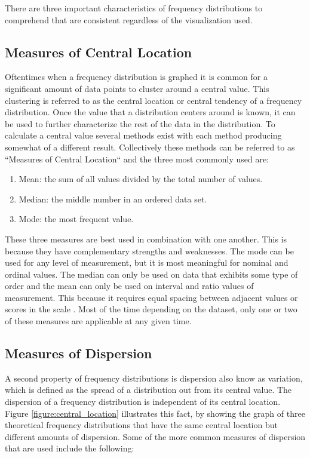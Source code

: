 There are three important characteristics of frequency distributions to comprehend
that are consistent regardless of the visualization used.

\subsection{Measures of Central Location}

Oftentimes when a frequency distribution is graphed it is common for a significant
amount of data points to cluster around a central value. This clustering is referred to
as the central location or central tendency of a frequency distribution. Once the 
value that a distribution centers around is known, it can be used to further 
characterize the rest of the data in the distribution. To calculate a central value 
several methods exist with each method producing somewhat of a different result. 
Collectively these methods can be referred to as ``Measures of Central Location`` 
and the three most commonly used are:

\begin{enumerate}
    \item Mean: the sum of all values divided by the total number of values.
    \item Median: the middle number in an ordered data set.
    \item Mode: the most frequent value.
\end{enumerate}

These three measures are best used in combination with one another. This is because 
they have complementary strengths and weaknesses. The mode can be used for any 
level of measurement, but it is most meaningful for nominal and ordinal values.
The median can only be used on data that exhibits some type of order and the mean 
can only be used on interval and ratio values of measurement. This because it requires 
equal spacing between adjacent values or scores in the scale \cite{c12}. Most of 
the time depending on the dataset, only one or two of these measures are applicable 
at any given time.

\subsection{Measures of Dispersion}

A second property of frequency distributions is dispersion also know as variation, which 
is defined as the spread of a distribution out from its central value. The dispersion 
of a frequency distribution is independent of its central location. Figure \ref{figure:central_location} 
illustrates this fact, by showing the graph of three theoretical frequency distributions that have 
the same central location but different amounts of dispersion. Some of the more common
measures of dispersion that are used include the following:

